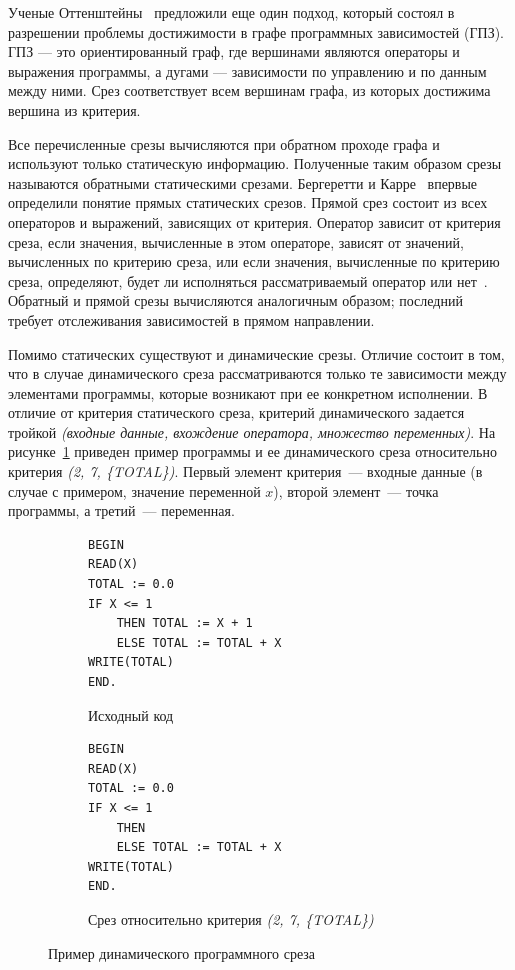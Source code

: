 Ученые Оттенштейны~\cite{ottenstein1984program} предложили еще один подход, который состоял в разрешении проблемы достижимости в графе программных зависимостей (ГПЗ). ГПЗ --- это ориентированный граф, где вершинами являются операторы и выражения программы, а дугами --- зависимости по управлению и по данным между ними. Срез соответствует всем вершинам графа, из которых достижима вершина из критерия.

Все перечисленные срезы вычисляются при обратном проходе графа и используют только статическую информацию.
Полученные таким образом срезы называются обратными статическими срезами. Бергеретти и Карре~\cite{bergeretti1985information} впервые определили понятие прямых статических срезов. Прямой срез состоит из всех операторов и выражений, зависящих от критерия. Оператор зависит от критерия среза, если значения, вычисленные в этом операторе, зависят от значений, вычисленных по критерию среза, или если значения, вычисленные по критерию среза, определяют, будет ли исполняться рассматриваемый оператор или нет~\cite{tip1994survey}. Обратный и прямой срезы вычисляются аналогичным образом; последний требует отслеживания зависимостей в прямом направлении.

Помимо статических существуют и динамические срезы. Отличие состоит в том, что в случае динамического среза рассматриваются только те зависимости между элементами программы, которые возникают при ее конкретном исполнении. В отличие от критерия статического среза, критерий динамического задается тройкой \textit{(входные данные, вхождение оператора, множество переменных)}. На рисунке~\ref{ex:dynslice} приведен пример программы и ее динамического среза относительно критерия \textit{(2, 7, \{TOTAL\})}. Первый элемент критерия~--- входные данные (в случае с примером, значение переменной $x$), второй элемент~--- точка программы, а третий~--- переменная.
%
\begin{figure}[]
\centering
\begin{subfigure}[t]{\linewidth}
\begin{lstlisting}[style = pascal]
BEGIN
READ(X)
TOTAL := 0.0
IF X <= 1
	THEN TOTAL := X + 1
	ELSE TOTAL := TOTAL + X
WRITE(TOTAL)
END.
\end{lstlisting}
\caption{Исходный код}
\end{subfigure}
\begin{subfigure}[t]{\linewidth}
\begin{lstlisting}[style = pascal]
BEGIN
READ(X)
TOTAL := 0.0
IF X <= 1
	THEN
	ELSE TOTAL := TOTAL + X
WRITE(TOTAL)
END.
\end{lstlisting}
\caption{Срез относительно критерия \textit{(2, 7, \{TOTAL\})}}
\end{subfigure}
\caption{Пример динамического программного среза}
\label{ex:dynslice}
\end{figure}

